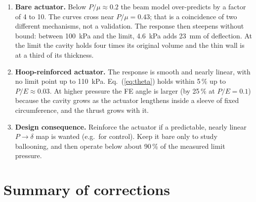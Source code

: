 \documentclass[11pt,a4paper]{article}
\numberwithin{equation}{section}
\begin{document}
\begin{enumerate}[nosep]
\item \textbf{Bare actuator.} Below $P/\mu\approx0.2$ the beam model over-predicts by a factor of 4 to 10. The curves cross near $P/\mu=0.43$; that is a coincidence of two different mechanisms, not a validation. The response then steepens without bound: between \SI{100}{kPa} and the limit, \SI{4.6}{kPa} adds \SI{23}{mm} of deflection. At the limit the cavity holds four times its original volume and the thin wall is at a third of its thickness.
\item \textbf{Hoop-reinforced actuator.} The response is smooth and nearly linear, with no limit point up to \SI{110}{kPa}. Eq.~(\ref{eq:theta}) holds within 5\,\% up to $P/E\approx0.03$. At higher pressure the FE angle is larger (by 25\,\% at $P/E=0.1$) because the cavity grows as the actuator lengthens inside a sleeve of fixed circumference, and the thrust grows with it.
\item \textbf{Design consequence.} Reinforce the actuator if a predictable, nearly linear $P\to\delta$ map is wanted (e.g.\ for control). Keep it bare only to study ballooning, and then operate below about 90\,\% of the measured limit pressure.
\end{enumerate}

\section{Summary of corrections}\label{sec:corrections}
\end{document}
